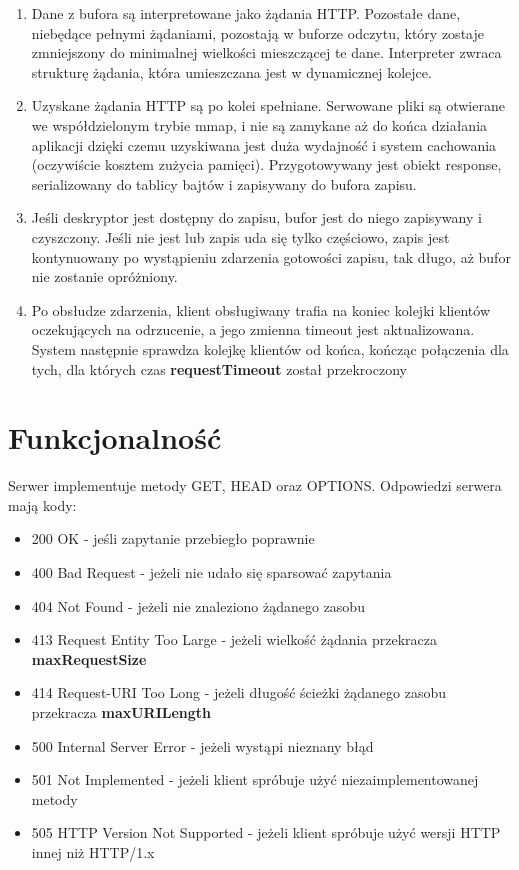 \documentclass[a4paper]{article}
\begin{document}
\begin{enumerate}
    \item Dane z bufora są interpretowane jako żądania HTTP. Pozostałe dane, niebędące pełnymi żądaniami, pozostają w buforze odczytu, który zostaje zmniejszony do minimalnej wielkości mieszczącej te dane. Interpreter zwraca strukturę żądania, która umieszczana jest w dynamicznej kolejce.
    \item Uzyskane żądania HTTP są po kolei spełniane. Serwowane pliki są otwierane we współdzielonym trybie mmap, i nie są zamykane aż do końca działania aplikacji dzięki czemu uzyskiwana jest duża wydajność i system cachowania (oczywiście kosztem zużycia pamięci). Przygotowywany jest obiekt response, serializowany do tablicy bajtów i zapisywany do bufora zapisu.
    \item Jeśli deskryptor jest dostępny do zapisu, bufor jest do niego zapisywany i czyszczony. Jeśli nie jest lub zapis uda się tylko częściowo, zapis jest kontynuowany po wystąpieniu zdarzenia gotowości zapisu, tak długo, aż bufor nie zostanie opróżniony.
    \item Po obsłudze zdarzenia, klient obsługiwany trafia na koniec kolejki klientów oczekujących na odrzucenie, a jego zmienna timeout jest aktualizowana. System następnie sprawdza kolejkę klientów od końca, kończąc połączenia dla tych, dla których czas \textbf{requestTimeout} został przekroczony
\end{enumerate}

\section{Funkcjonalność}
Serwer implementuje metody GET, HEAD oraz OPTIONS. Odpowiedzi serwera mają kody:
\begin{itemize}
    \item 200 OK - jeśli zapytanie przebiegło poprawnie
    \item 400 Bad Request - jeżeli nie udało się sparsować zapytania
    \item 404 Not Found - jeżeli nie znaleziono żądanego zasobu
    \item 413 Request Entity Too Large - jeżeli wielkość żądania przekracza \textbf{maxRequestSize}
    \item 414 Request-URI Too Long - jeżeli długość ścieżki żądanego zasobu przekracza \textbf{maxURILength}
    \item 500 Internal Server Error - jeżeli wystąpi nieznany błąd
    \item 501 Not Implemented - jeżeli klient spróbuje użyć niezaimplementowanej metody
    \item 505 HTTP Version Not Supported - jeżeli klient spróbuje użyć wersji HTTP innej niż HTTP/1.x
\end{itemize}
\end{document}
